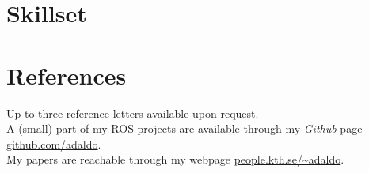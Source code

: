 \documentclass[11pt,a4paper,sans]{moderncv}        %
\newcommand{\adaldoweb}{people.kth.se/~adaldo}
\newcommand{\adaldogithub}{github.com/adaldo}
\begin{document}

\section{Skillset}


\section{References}
Up to three reference letters available upon request.\\
A (small) part of my ROS projects are available through my \emph{Github} page \url{\adaldogithub}.\\
My papers are reachable through my webpage \url{\adaldoweb}.
\end{document}
